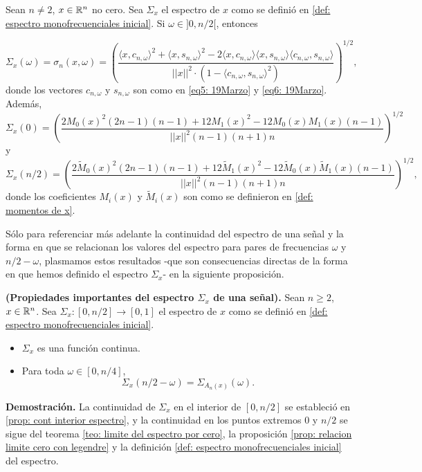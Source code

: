 \begin{prop}
\label{prop: formula explicita espectro}
Sean $n \neq 2$, $x \in \mathbb{R}^{n}$ no cero.
Sea $\Sigma_{x}$ el espectro de $x$ como se definió en 
\ref{def: espectro monofrecuenciales inicial}.
Si $\omega \in ]0, n/2[$, entonces

\[
\Sigma_{x}(\omega) = 
\sigma_{n}(x, \omega) =
	\left(		  
		  \frac{\langle x, c_{n, \omega } \rangle^{2} +  \langle x, s_{n, \omega } \rangle^{2}	
	       -2  \langle x, c_{n, \omega } \rangle \langle x, s_{n, \omega } \rangle \langle c_{n, \omega }, s_{n, \omega } \rangle}{ || x ||^{2} \cdot
	       (1- \langle c_{n, \omega }, s_{n, \omega } \rangle^{2})}	  
\right) ^{1/2},
\]
donde los vectores $c_{n, \omega}$ y $s_{n, \omega}$
son como en \eqref{eq5: 19Marzo} y \eqref{eq6: 19Marzo}.
Además, 
\[
\Sigma_{x}(0) = 
\left(
\frac{
2M_{0}(x)^{2}(2n-1)(n-1) + 12M_{1}(x)^{2} - 12M_{0}(x)M_{1}(x)(n-1)
}{
||x||^{2} (n-1)(n+1)n}
\right)^{1/2}
\]
y
\[
\Sigma_{x}(n/2) = 
\left(
\frac{
2\tilde{M}_{0}(x)^{2}(2n-1)(n-1) + 12
\tilde{M}_{1}(x)^{2} - 12 \tilde{M}_{0}(x) \tilde{M}_{1}(x)(n-1)
}{
||x||^{2} (n-1)(n+1)n}
\right)^{1/2},
\]
donde los coeficientes $M_{i}(x)$ y $\tilde{M}_{i}(x)$
son como se definieron en 
\ref{def: momentos de x}. 
\end{prop}

Sólo para referenciar más adelante 
la continuidad del espectro de una 
señal y la forma en que se relacionan los valores
del espectro para pares de frecuencias $\omega$ y $n/2-\omega$,
plasmamos estos resultados 
-que son consecuencias directas de la forma en que hemos
definido el espectro $\Sigma_{x}$-
en la siguiente proposición.


\begin{prop}
\label{prop: continuidad espctro espacois monof.}
\textbf{(Propiedades importantes del espectro $\Sigma_{x}$ de una señal).}
Sean $n \geq 2$, $x \in \mathbb{R}^{n}$.
Sea $\Sigma_{x}:[0, n/2] \rightarrow [0,1]$ el espectro 
de $x$ como se definió en 
\ref{def: espectro monofrecuenciales inicial}.
\begin{itemize}
	\item $\Sigma_{x}$ es una función continua.
	\item Para toda $\omega \in [0, n/4]$,
	\[
	\Sigma_{x}(n/2-\omega) = \Sigma_{A_{n}(x)}(\omega).
	\]
\end{itemize}
\end{prop}
\noindent
\textbf{Demostración.}
La continuidad de $\Sigma_{x}$ en el interior de
$[0, n/2]$ se estableció en
\ref{prop: cont interior espectro}, y la continuidad
en los puntos extremos $0$ y $n/2$
se sigue del
teorema \ref{teo: limite del espectro por cero},
la proposición
\ref{prop: relacion limite cero con legendre}
y la definición \ref{def: espectro monofrecuenciales inicial}
del espectro. \\

